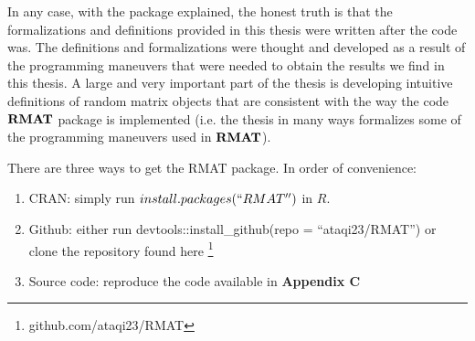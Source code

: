 In any case, with the package explained, the honest truth is that the formalizations and definitions provided in this thesis were written after the code was. The
definitions and formalizations were thought and developed as a result of the programming maneuvers that were needed to obtain the results we find in this thesis.
A large and very important part of the thesis is developing intuitive definitions of random matrix objects that are consistent with the way the code ${\textbf{RMAT}}$ package is implemented
(i.e. the thesis in many ways formalizes some of the programming maneuvers used in ${\textbf{RMAT}}$).


There are three ways to get the RMAT package. In order of convenience:

\begin{enumerate}
  \item CRAN: simply run $install.packages(``RMAT'')$ in $R$.
  \item Github: either run devtools::install\_github(repo = ``ataqi23/RMAT'') or clone the repository found here \footnote{github.com/ataqi23/RMAT}
  \item Source code: reproduce the code available in \textbf{Appendix C}
\end{enumerate}
